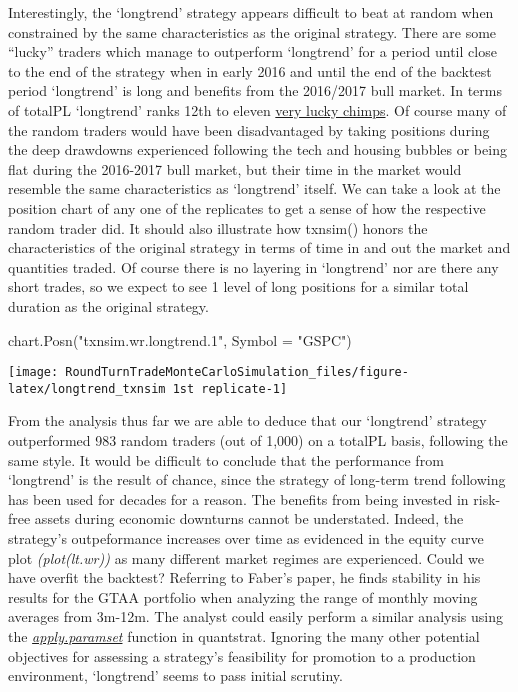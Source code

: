 Interestingly, the `longtrend' strategy appears difficult to beat at
random when constrained by the same characteristics as the original
strategy. There are some ``lucky'' traders which manage to outperform
`longtrend' for a period until close to the end of the strategy when in
early 2016 and until the end of the backtest period `longtrend' is long
and benefits from the 2016/2017 bull market. In terms of totalPL
`longtrend' ranks 12th to eleven
\href{http://www.followingthetrend.com/2016/04/you-cant-beat-all-the-chimps/}{very
lucky chimps}. Of course many of the random traders would have been
disadvantaged by taking positions during the deep drawdowns experienced
following the tech and housing bubbles or being flat during the
2016-2017 bull market, but their time in the market would resemble the
same characteristics as `longtrend' itself. We can take a look at the
position chart of any one of the replicates to get a sense of how the
respective random trader did. It should also illustrate how txnsim()
honors the characteristics of the original strategy in terms of time in
and out the market and quantities traded. Of course there is no layering
in `longtrend' nor are there any short trades, so we expect to see 1
level of long positions for a similar total duration as the original
strategy.

\begin{Schunk}
\begin{Sinput}
chart.Posn("txnsim.wr.longtrend.1", Symbol = "GSPC")
\end{Sinput}


\begin{center}\texttt{[image: RoundTurnTradeMonteCarloSimulation\_files/figure-latex/longtrend\_txnsim 1st replicate-1]} \end{center}

\end{Schunk}

From the analysis thus far we are able to deduce that our `longtrend'
strategy outperformed 983 random traders (out of 1,000) on a totalPL
basis, following the same style. It would be difficult to conclude that
the performance from `longtrend' is the result of chance, since the
strategy of long-term trend following has been used for decades for a
reason. The benefits from being invested in risk-free assets during
economic downturns cannot be understated. Indeed, the strategy's
outpeformance increases over time as evidenced in the equity curve plot
\emph{(plot(lt.wr))} as many different market regimes are experienced.
Could we have overfit the backtest? Referring to Faber's paper, he finds
stability in his results for the GTAA portfolio when analyzing the range
of monthly moving averages from 3m-12m. The analyst could easily perform
a similar analysis using the
\href{https://github.com/braverock/quantstrat/blob/master/R/paramsets.R}{\emph{apply.paramset}}
function in quantstrat. Ignoring the many other potential objectives for
assessing a strategy's feasibility for promotion to a production
environment, `longtrend' seems to pass initial scrutiny.

